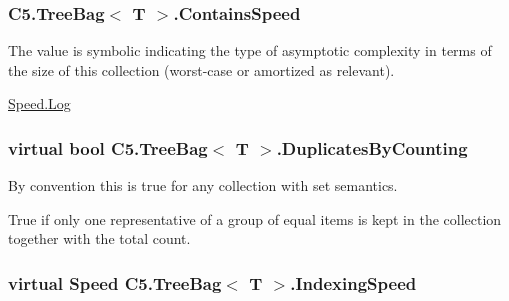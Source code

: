 \subsubsection[{Contains\+Speed}]{ {\bf C5.\+Tree\+Bag}$<$ T $>$.Contains\+Speed\hspace{0.3cm}{\ttfamily [get]}}\label{class_c5_1_1_tree_bag_abb9302b90eec04c6eaca70c7cfeed117}


The value is symbolic indicating the type of asymptotic complexity in terms of the size of this collection (worst-\/case or amortized as relevant). 

\hyperlink{namespace_c5_a615ba88dcdaa8d5a3c5f833a73d7fad6ace0be71e33226e4c1db2bcea5959f16b}{Speed.\+Log}\hypertarget{class_c5_1_1_tree_bag_ab30340e576e1bb284ffcb161b54ba5c7}{}
\subsubsection[{Duplicates\+By\+Counting}]{\setlength{\rightskip}{0pt plus 5cm}virtual bool {\bf C5.\+Tree\+Bag}$<$ T $>$.Duplicates\+By\+Counting\hspace{0.3cm}{\ttfamily [get]}}\label{class_c5_1_1_tree_bag_ab30340e576e1bb284ffcb161b54ba5c7}


By convention this is true for any collection with set semantics. 

True if only one representative of a group of equal items is kept in the collection together with the total count.\hypertarget{class_c5_1_1_tree_bag_aeae7ae92a52a654311d76ccadaaa0d4d}{}
\subsubsection[{Indexing\+Speed}]{\setlength{\rightskip}{0pt plus 5cm}virtual {\bf Speed} {\bf C5.\+Tree\+Bag}$<$ T $>$.Indexing\+Speed\hspace{0.3cm}{\ttfamily [get]}}\label{class_c5_1_1_tree_bag_aeae7ae92a52a654311d76ccadaaa0d4d}




\hypertarget{class_c5_1_1_tree_bag_a51345f4ffe46dd62758f63ff084f3062}{}

